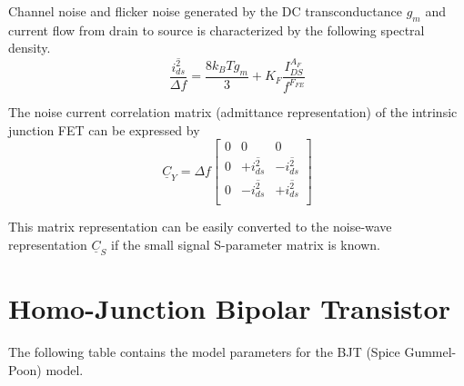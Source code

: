 \documentclass[10pt]{report}
\begin{document}
Channel noise and flicker noise generated by the DC transconductance
$g_m$ and current flow from drain to source is characterized by the
following spectral density.
\begin{equation}
\dfrac{\overline{i_{ds}^2}}{\Delta f} = \dfrac{8 k_B T g_m}{3} + K_F\dfrac{I_{DS}^{A_F}}{f^{F_{FE}}}
\end{equation}

The noise current correlation matrix (admittance representation) of
the intrinsic junction FET can be expressed by
\begin{equation}
\underline{C}_Y = \Delta f
\begin{bmatrix}
0 & 0 & 0\\
0 & +\overline{i_{ds}^2} & -\overline{i_{ds}^2}\\
0 & -\overline{i_{ds}^2} & +\overline{i_{ds}^2}\\
\end{bmatrix}
\end{equation}

This matrix representation can be easily converted to the noise-wave
representation $\underline{C}_S$ if the small signal S-parameter
matrix is known.

\section{Homo-Junction Bipolar Transistor}

The following table contains the model parameters for the BJT (Spice
Gummel-Poon) model.

\addvspace{12pt}
\end{document}
